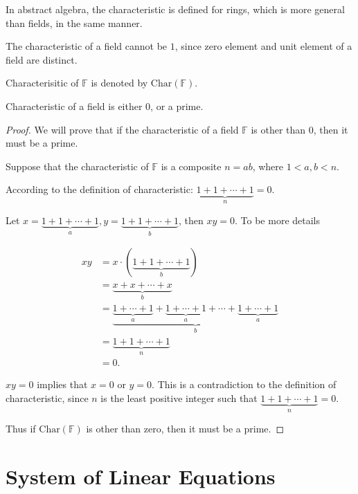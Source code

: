 \begin{note}
	In abstract algebra, the characteristic is defined for rings, which is more general than fields, in the same manner.

	The characteristic of a field cannot be $1$, since zero element and unit element of a field are distinct.

    Characterisitic of $\mathbb{F}$ is denoted by $\text{Char}(\mathbb{F})$.
\end{note}

\begin{theorem}
	Characteristic of a field is either $0$, or a prime.
\end{theorem}

\begin{proof}
	We will prove that if the characteristic of a field $\mathbb{F}$ is other than $0$, then it must be a prime.

	Suppose that the characteristic of $\mathbb{F}$ is a composite $n = ab$, where $1 < a, b < n$.

	According to the definition of characteristic: $\underbrace{1 + 1 + \cdots + 1}_{n} = 0$.

    Let $x = \underbrace{1 + 1 + \cdots + 1}_{a}, y = \underbrace{1 + 1 + \cdots + 1}_{b}$, then $xy = 0$. To be more details

    \begin{align*}
        xy & = x\cdot (\underbrace{1 + 1 + \cdots + 1}_{b}) \\
           & = \underbrace{x + x + \cdots + x}_{b} \\
           & = \underbrace{\underbrace{1 + \cdots + 1}_{a} + \underbrace{1 + \cdots + 1}_{a} + \cdots + \underbrace{1 + \cdots + 1}_{a}}_{b} \\
           & = \underbrace{1 + 1 + \cdots + 1}_{n} \\
           & = 0.
    \end{align*}

    $xy = 0$ implies that $x = 0$ or $y = 0$. This is a contradiction to the definition of characteristic, since $n$ is the least positive integer such that $\underbrace{1 + 1 + \cdots + 1}_{n} = 0$.

    Thus if $\text{Char}(\mathbb{F})$ is other than zero, then it must be a prime.
\end{proof}

\section{System of Linear Equations}

